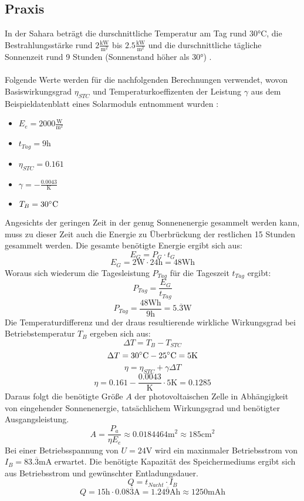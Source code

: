 \subsection{Praxis}
    In der Sahara beträgt die durschnittliche Temperatur am Tag rund
    30°C, die Bestrahlungsstärke rund \( 2 \mathrm{\frac{kW}{m^2}} \)
    bis \( 2.5 \mathrm{\frac{kW}{m^2}} \) und die durschnittliche
    tägliche Sonnenzeit rund 9 Stunden (Sonnenstand höher als 30°)
    \cite{Wiki_SolarAfrica, DateTimeWestSahara}.
    \\\\
    Folgende Werte werden für die nachfolgenden Berechnungen verwendet,
    wovon Basiswirkungsgrad \( \eta_{STC}\) und Temperaturkoeffizenten
    der Leistung \( \gamma \) aus dem Beispieldatenblatt eines
    Solarmoduls entnomment wurden \cite{SolarDatasheet}:
    \begin{itemize}
        \item \( E_e = 2000 \mathrm{\frac{W}{m^2}} \)
        \item \( t_{Tag} = 9 \mathrm{h} \)
        \item \( \eta_{STC} = 0.161 \)
        \item \( \gamma = -\mathrm{\frac{0.0043}{K}} \)
        \item \( T_B = 30 \degree \mathrm{C}\)
    \end{itemize}
    Angesichts der geringen Zeit in der genug Sonnenenergie gesammelt
    werden kann, muss zu dieser Zeit auch die Energie zu Überbrückung der
    restlichen 15 Stunden gesammelt werden. Die gesamte benötigte Energie
    ergibt sich aus:
        \[ E_G = P_G \cdot t_G \]
        \[ E_G = 2 \mathrm{W} \cdot 24 \mathrm{h} = 48 \mathrm{Wh} \]
    Woraus sich wiederum die Tagesleistung \( P_{Tag} \) für die
    Tageszeit \( t_{Tag} \) ergibt:
        \[ P_{Tag}  = \frac{E_G}{t_{Tag}} \]
        \[ P_{Tag} = \frac{48 \mathrm{Wh}}{9 \mathrm{h}} =
        5.\overline{3} \mathrm{W} \]
    Die Temperaturdifferenz und der draus resultierende wirkliche
    Wirkungsgrad bei Betriebstemperatur \( T_B \) ergeben sich aus:
        \[ \Delta T = T_B - T_{STC} \]
        \[ \Delta T = 30 \mathrm{\degree C} - 25 \mathrm{\degree C}
        = 5 \mathrm{K} \]
        \[ \eta = \eta_{STC} + \gamma \Delta T \]
        \[ \eta = 0.161 - \mathrm{\frac{0.0043}{K}} \cdot 5 \mathrm{K}
        = 0.1285 \]
    Daraus folgt die benötigte Größe \( A \) der photovoltaischen
    Zelle in Abhängigkeit von eingehender Sonnenenergie, tatsächlichem
    Wirkungsgrad und benötigter Ausgangsleistung.
        \[ A = \frac{P_a}{\eta E_e} \approx 0.0184464 \mathrm{m^2}
        \approx 185 \mathrm{cm^2} \]
    Bei einer Betriebsspannung von \( U = 24 \mathrm{V} \) wird ein
    maxinmaler Betriebsstrom von \( I_B = 83.\overline{3}
    \mathrm{mA} \) erwartet. Die benötigte Kapazität des Speichermediums
    ergibt sich aus Betriebsstrom und gewünschter Entladungsdauer.
        \[ Q = t_{Nacht} \cdot I_B \]
        \[ Q = 15 \mathrm{h} \cdot 0.08\overline{3} \mathrm{A} =
        1.24\overline{9} \mathrm{Ah} \approx 1250 \mathrm{mAh} \]

